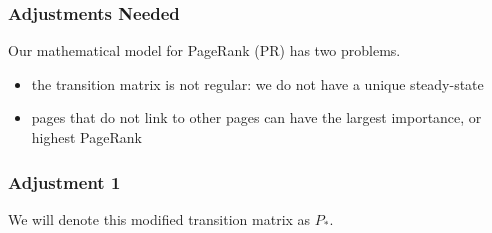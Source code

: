 \begin{frame}
\frametitle{Adjustments Needed}

Our mathematical model for PageRank (PR) has two problems.
\begin{itemize}
    \item the transition matrix is not regular: we do not have a unique steady-state
    \item pages that do not link to other pages can have the largest importance, or highest PageRank
\end{itemize}

\end{frame}


\begin{frame}
\frametitle{Adjustment 1}

    
    \begin{center}\end{center}


    \vspace{6pt} 
    
    We will denote this modified transition matrix as $P_*$. 

\end{frame}



